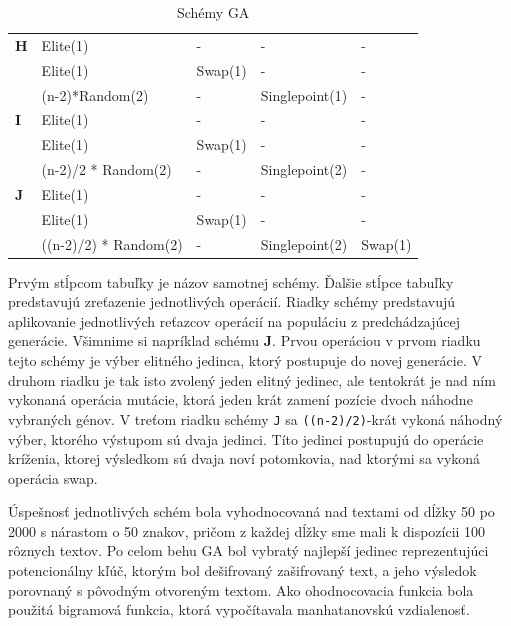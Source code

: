 \begin{table}[!htbp]
\begin{tabular}{@{}lllll@{}}
\textbf{H}      & Elite(1)                  & -                & -                 & -                    \\
                & Elite(1)                  & Swap(1)          & -                 & -                    \\
                & (n-2)*Random(2)           & -                & Singlepoint(1)    & -                    \\ \midrule
\textbf{I}      & Elite(1)                  & -                & -                 & -                    \\
                & Elite(1)                  & Swap(1)          & -                 & -                    \\
                & (n-2)/2 * Random(2)       & -                & Singlepoint(2)    & -                    \\ \midrule
\textbf{J}      & Elite(1)                  & -                & -                 & -                    \\
                & Elite(1)                  & Swap(1)          & -                 & -                    \\
                & ((n-2)/2) * Random(2)     & -                & Singlepoint(2)    & Swap(1)              \\ \bottomrule
\end{tabular}
\caption{Schémy GA}
\label{tab:schemy}
\end{table}

Prvým stĺpcom tabuľky je názov samotnej schémy. Ďalšie stĺpce tabuľky predstavujú zreťazenie jednotlivých operácií. Riadky schémy predstavujú aplikovanie jednotlivých reťazcov operácií na populáciu z predchádzajúcej generácie.
Všimnime si napríklad schému \textbf{J}.
Prvou operáciou v prvom riadku tejto schémy je výber elitného jedinca, ktorý postupuje do novej generácie.
V druhom riadku je tak isto zvolený jeden elitný jedinec, ale tentokrát je nad ním vykonaná operácia mutácie, ktorá jeden krát zamení pozície dvoch náhodne vybraných génov.
V treťom riadku schémy \texttt{J} sa \texttt{((n-2)/2)}-krát vykoná náhodný výber, ktorého výstupom sú dvaja jedinci. Títo jedinci postupujú do operácie kríženia, ktorej výsledkom sú dvaja noví potomkovia, nad ktorými sa vykoná operácia swap.

Úspešnosť jednotlivých schém bola vyhodnocovaná nad textami od dĺžky 50 po 2000 s nárastom o 50 znakov,
pričom z každej dĺžky sme mali k dispozícii 100 rôznych textov.
Po celom behu GA bol vybratý najlepší jedinec reprezentujúci potencionálny kľúč,
ktorým bol dešifrovaný zašifrovaný text, a jeho výsledok porovnaný s pôvodným otvoreným textom.
Ako ohodnocovacia funkcia bola použitá bigramová funkcia, ktorá vypočítavala manhatanovskú vzdialenosť.

